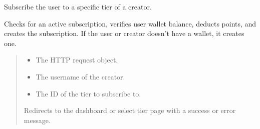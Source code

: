 \documentclass[letterpaper,10pt,english]{sphinxmanual}
\begin{document}
\begin{fulllineitems}
\label{\detokenize{modules/views:client.views.subscribe_to_tier}}
\pysigstartsignatures
{}
\pysigstopsignatures
\sphinxAtStartPar
Subscribe the user to a specific tier of a creator.

\sphinxAtStartPar
Checks for an active subscription, verifies user wallet balance, deducts points,
and creates the subscription. If the user or creator doesn’t have a wallet, it creates one.
\begin{quote}\begin{description}
\begin{itemize}
\item {} 
\sphinxAtStartPar
{} \textendash{} The HTTP request object.

\item {} 
\sphinxAtStartPar
{} \textendash{} The username of the creator.

\item {} 
\sphinxAtStartPar
{} \textendash{} The ID of the tier to subscribe to.

\end{itemize}

\sphinxAtStartPar
Redirects to the dashboard or select tier page with a success or error message.

\end{description}\end{quote}

\end{fulllineitems}

\end{document}

